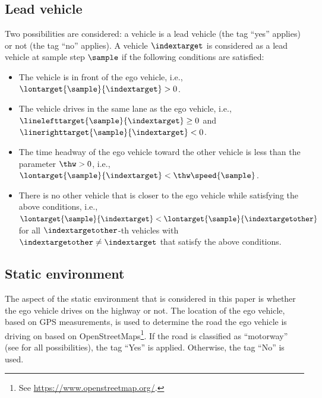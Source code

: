 \subsection{Lead vehicle}
\label{sec:lead vehicle}

Two possibilities are considered: a vehicle is a lead vehicle (the tag ``yes'' applies) or not (the tag ``no'' applies). A vehicle $\indextarget$ is considered as a lead vehicle at sample step $\sample$ if the following conditions are satisfied:
\begin{itemize}
	\item The vehicle is in front of the ego vehicle, i.e., $\lontarget{\sample}{\indextarget}>0$.
	\item The vehicle drives in the same lane as the ego vehicle, i.e., $\linelefttarget{\sample}{\indextarget} \geq 0$ and $\linerighttarget{\sample}{\indextarget} < 0$.
	\item The time headway of the ego vehicle toward the other vehicle is less than the parameter $\thw>0$, i.e., $\lontarget{\sample}{\indextarget} 
	< \thw \speed{\sample}$.
	\item There is no other vehicle that is closer to the ego vehicle while satisfying the above conditions, i.e., $\lontarget{\sample}{\indextarget} < \lontarget{\sample}{\indextargetother}$ for all $\indextargetother$-th vehicles with $\indextargetother \ne \indextarget$ that satisfy the above conditions.
\end{itemize}
\cendc



\subsection{Static environment}
\label{sec:static environment}

\cstartc
The aspect of the static environment that is considered in this paper is whether the ego vehicle drives on the highway or not. The location of the ego vehicle, based on GPS measurements, is used to determine the road the ego vehicle is driving on based on OpenStreetMaps\footnote{\cstartc See \url{https://www.openstreetmap.org/}.\cendc}. If the road is classified as ``motorway'' (see \autocite{osm_highway} for all possibilities), the tag ``Yes'' is applied. Otherwise, the tag ``No'' is used.
\cendc
